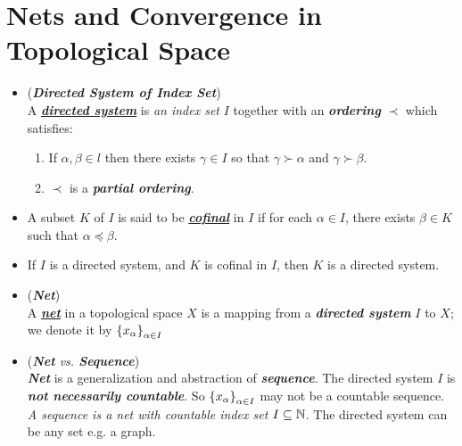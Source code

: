 \documentclass[11pt]{article}
\begin{document}
\section{Nets and Convergence in Topological Space}
\begin{itemize}
\item \begin{definition} (\emph{\textbf{Directed System of Index Set}})\\
A \underline{\emph{\textbf{directed system}}} is \emph{an index set} $I$ together with an \emph{\textbf{ordering}} $\prec$ which satisfies:
\begin{enumerate}
\item If $\alpha, \beta \in l$ then there exists $\gamma \in I$ so that $\gamma \succ \alpha$ and $\gamma \succ \beta$.
\item $\prec$  is a \textbf{\emph{partial ordering}}.
\end{enumerate}
\end{definition}

\item \begin{definition}
A subset $K$ of $I$ is said to be \underline{\emph{\textbf{cofinal}}} in $I$ if for each $\alpha \in I$, there exists $\beta \in K$ such that $\alpha \preceq \beta$. 
\end{definition}

\item \begin{proposition}
If $I$ is a directed system, and $K$ is cofinal in $I$, then $K$ is a directed system. 
\end{proposition}

\item \begin{definition} (\textbf{\emph{Net}})\\
A \underline{\emph{\textbf{net}}} in a topological space $X$ is a mapping from a \emph{\textbf{directed system}} $I$ to $X$; we denote it by $\left\{x_\alpha\right\}_{\alpha \in I}$
\end{definition}

\item \begin{remark} (\emph{\textbf{Net} vs. \textbf{Sequence}})\\
\emph{\textbf{Net}} is a generalization and abstraction of \emph{\textbf{sequence}}. The directed system $I$ is \emph{\textbf{not necessarily countable}}. So $\left\{x_\alpha\right\}_{\alpha \in I}$ may not be a countable sequence. \emph{A sequence is a net with countable index set $I \subseteq {\mathbb N}$}. The directed system can be any set e.g. a graph.
\end{remark}


\end{itemize}
\end{document}
